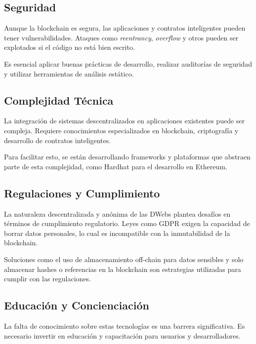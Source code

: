 \subsection{Seguridad}

Aunque la blockchain es segura, las aplicaciones y contratos inteligentes pueden tener vulnerabilidades. Ataques como \textit{reentrancy}, \textit{overflow} y otros pueden ser explotados si el código no está bien escrito.

Es esencial aplicar buenas prácticas de desarrollo, realizar auditorías de seguridad y utilizar herramientas de análisis estático.

\subsection{Complejidad Técnica}

La integración de sistemas descentralizados en aplicaciones existentes puede ser compleja. Requiere conocimientos especializados en blockchain, criptografía y desarrollo de contratos inteligentes.

Para facilitar esto, se están desarrollando frameworks y plataformas que abstraen parte de esta complejidad, como Hardhat para el desarrollo en Ethereum.

\subsection{Regulaciones y Cumplimiento}

La naturaleza descentralizada y anónima de las DWebs plantea desafíos en términos de cumplimiento regulatorio. Leyes como GDPR exigen la capacidad de borrar datos personales, lo cual es incompatible con la inmutabilidad de la blockchain.

Soluciones como el uso de almacenamiento off-chain para datos sensibles y solo almacenar hashes o referencias en la blockchain son estrategias utilizadas para cumplir con las regulaciones.

\subsection{Educación y Concienciación}

La falta de conocimiento sobre estas tecnologías es una barrera significativa. Es necesario invertir en educación y capacitación para usuarios y desarrolladores.

